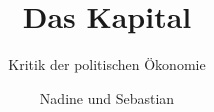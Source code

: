 \documentclass{beamer}
\begin{document}
\author{Nadine und Sebastian}
\title{Das Kapital}
\subtitle{Kritik der politischen Ökonomie}
\maketitle

\tableofcontents



%











%
%
 
\end{document}
